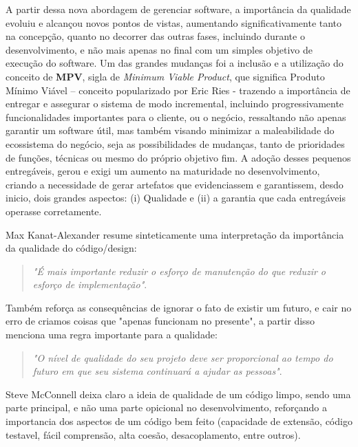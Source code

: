 \documentclass[12pt]{article}
\begin{document}
 A partir dessa nova abordagem de gerenciar software, a importância da qualidade evoluiu e alcançou novos pontos de vistas, aumentando significativamente tanto na concepção, quanto no decorrer das outras fases, incluindo durante o desenvolvimento, e não mais apenas no final com um simples objetivo de execução do software. Um das grandes mudanças foi a inclusão e a utilização do conceito de \textbf{MPV}, sigla de \textit{Minimum Viable Product}, que significa Produto Mínimo Viável – conceito popularizado por Eric Ries \cite{ERICRIES_THELEAN} - trazendo a importância de entregar e assegurar o sistema de modo incremental, incluindo progressivamente funcionalidades importantes para o cliente, ou o negócio, ressaltando não apenas garantir um software útil, mas também visando minimizar a maleabilidade do ecossistema do negócio, seja as possibilidades de mudanças, tanto de prioridades de funções, técnicas ou mesmo do próprio objetivo fim. A adoção desses pequenos entregáveis, gerou e exigi um aumento na maturidade no desenvolvimento, criando a necessidade de gerar artefatos que evidenciassem e garantissem, desdo inicio, dois grandes aspectos: (i) Qualidade e (ii) a garantia que cada entregáveis operasse corretamente.

 Max Kanat-Alexander \cite{CODE_SIMPLICITY} resume sinteticamente uma interpretação da importância da qualidade do código/design: 

\begin{quote}
 \emph{"É mais importante reduzir o esforço de manutenção do que reduzir o esforço de implementação"}.
\end{quote} 


 Também reforça as consequências de ignorar o fato de existir um futuro, e cair no erro de criamos coisas que "apenas funcionam no presente", a partir disso menciona uma regra importante para a qualidade: 

\begin{quote}
 \emph{"O nível de qualidade do seu projeto deve ser proporcional ao tempo do futuro em que seu sistema continuará a ajudar as pessoas"}.
\end{quote} 


	Steve McConnell \cite{CODE_COMPLETE_2} deixa claro a ideia de qualidade de um código limpo, sendo uma parte principal, e não uma parte opicional no desenvolvimento, reforçando a importancia dos aspectos de um código bem feito (capacidade de extensão, código testavel, fácil comprensão, alta coesão, desacoplamento, entre outros).
	 
\end{document}
